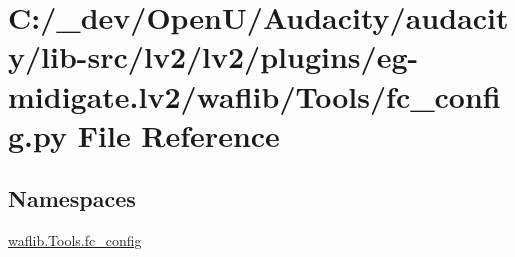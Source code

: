 \hypertarget{lv2_2plugins_2eg-midigate_8lv2_2waflib_2_tools_2fc__config_8py}{}\section{C\+:/\+\_\+dev/\+Open\+U/\+Audacity/audacity/lib-\/src/lv2/lv2/plugins/eg-\/midigate.lv2/waflib/\+Tools/fc\+\_\+config.py File Reference}
\label{lv2_2plugins_2eg-midigate_8lv2_2waflib_2_tools_2fc__config_8py}
\subsection*{Namespaces}
\begin{DoxyCompactItemize}
\item 
 \hyperlink{namespacewaflib_1_1_tools_1_1fc__config}{waflib.\+Tools.\+fc\+\_\+config}
\end{DoxyCompactItemize}
